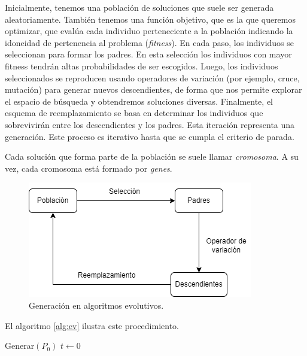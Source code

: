 Inicialmente, tenemos una población de soluciones que suele ser generada aleatoriamente. También tenemos una función objetivo, que es la que queremos optimizar, que evalúa cada individuo perteneciente a la población indicando la idoneidad de pertenencia al problema (\emph{fitness}). En cada paso, los individuos se seleccionan para formar los padres. En esta selección los individuos con mayor fitness tendrán altas probabilidades de ser escogidos. Luego, los individuos seleccionados se reproducen usando operadores de variación (por ejemplo, cruce, mutación) para generar nuevos descendientes, de forma que nos permite explorar el espacio de búsqueda y obtendremos soluciones diversas. Finalmente, el esquema de reemplazamiento se basa en determinar los individuos que sobrevivirán entre los descendientes y los padres. Esta iteración representa una generación. Este proceso es iterativo hasta que se cumpla el criterio de parada.

Cada solución que forma parte de la población se suele llamar \emph{cromosoma}. A su vez, cada cromosoma está formado por \emph{genes}.

\begin{figure}[H]   
	\center
	\includegraphics[scale=0.5]{figures/Algoritmos_evolutivos.png}
	\caption{Generación en algoritmos evolutivos.}
    \label{fg:alg_ev}
\end{figure}

El algoritmo \ref{alg:ev} ilustra este procedimiento.

\begin{Ualgorithm}[H]
    \label{alg:ev}
    \small
    \DontPrintSemicolon
    Generar$(P_0)$ 
    $t \longleftarrow 0$\;
\end{Ualgorithm}


